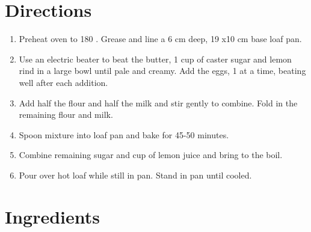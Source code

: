 \section*{Directions}
\begin{enumerate}
	\item Preheat oven to 180 \textcelsius . Grease and line a 6 cm deep, 19 x10 cm base loaf pan.
	\item Use an electric beater to beat the butter, 1 cup of caster sugar and lemon rind in a large bowl until pale and creamy.
		Add the eggs, 1 at a time, beating well after each addition.
	\item Add half the flour and half the milk and stir gently to combine. Fold in the remaining flour and milk.
	\item Spoon mixture into loaf pan and bake for 45-50 minutes.
	\item Combine remaining sugar and  cup of lemon juice and bring to the boil.
	\item Pour over hot loaf while still in pan.  Stand in pan until cooled.

\end{enumerate}



\bigskip
\section*{Ingredients}

